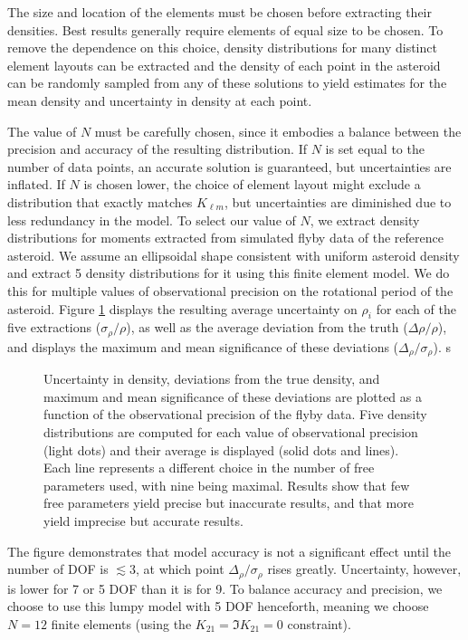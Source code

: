 \documentclass[fleqn,usenatbib]{mnras}
\begin{document}
The size and location of the elements must be chosen before extracting their densities. Best results generally require elements of equal size to be chosen. To remove the dependence on this choice, density distributions for many distinct element layouts can be extracted and the density of each point in the asteroid can be randomly sampled from any of these solutions to yield estimates for the mean density and uncertainty in density at each point.

The value of $N$ must be carefully chosen, since it embodies a balance between the precision and accuracy of the resulting distribution. If $N$ is set equal to the number of data points, an accurate solution is  guaranteed, but uncertainties are inflated. If $N$ is chosen lower, the choice of element layout might exclude a distribution that exactly matches $K_{\ell m}$, but uncertainties are diminished due to less redundancy in the model. To select our value of $N$, we extract density distributions for moments extracted from simulated flyby data of the reference asteroid. We assume an ellipsoidal shape consistent with uniform asteroid density and extract 5 density distributions for it using this finite element model. We do this for multiple values of observational precision on the rotational period of the asteroid. Figure \ref{fig:dof-scan} displays the resulting average uncertainty on $\rho_i$ for each of the five extractions ($\sigma_\rho / \rho$), as well as the average deviation from the truth  ($\Delta \rho / \rho$), and displays the maximum and mean significance of these deviations ($\Delta_\rho / \sigma_\rho$).
s\begin{figure}
  \centering
  \caption{Uncertainty in density, deviations from the true density, and maximum and mean significance of these deviations are plotted as a function of the observational precision of the flyby data. Five density distributions are computed for each value of observational precision (light dots) and their average is displayed (solid dots and lines). Each line represents a different choice in the number of free parameters used, with nine being maximal. Results show that few free parameters yield precise but inaccurate results, and that more yield imprecise but accurate results.}
  \label{fig:dof-scan}
\end{figure}
The figure demonstrates that model accuracy is not a significant effect until the number of DOF is $\lesssim 3$, at which point $\Delta_\rho / \sigma_\rho$ rises greatly. Uncertainty, however, is lower for 7 or 5 DOF than it is for 9. To balance accuracy and precision, we choose to use this lumpy model with 5 DOF henceforth, meaning we choose $N=12$ finite elements (using the $K_{21} = \Im K_{21} = 0$ constraint).
\end{document}
